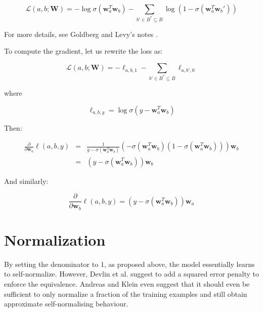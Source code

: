 \documentclass[a4paper,oneside,12pt]{article}
\begin{document}
\begin{equation}
\mathcal{L} (a, b ; \mathbf{W}) = -\log \sigma \left( \mathbf{w}_a^T \mathbf{w}_b \right) - \sum_{b' \in B^* \subseteq B} \log \left( 1 - \sigma \left( \mathbf{w}_a^T \mathbf{w}_b' \right) \right)
\end{equation}


For more details, see Goldberg and Levy's notes \cite{Goldberg2014word2vecED}.

To compute the gradient, let us rewrite the loss as:

\begin{equation}
\mathcal{L} (a, b ; \mathbf{W}) = -\ell_{a, b, 1} - \sum_{b' \in B^* \subseteq B} \ell_{a, b', 0}
\end{equation}

where

\begin{equation}
\ell_{a, b, y} = \log \sigma \left( y - \mathbf{w}_a^T \mathbf{w}_b \right)
\end{equation}

Then:

\begin{equation}
\begin{array}{lll}
\frac{\partial}{\partial \mathbf{w}_a} \ell (a, b, y) & = & \frac{1}{y - \sigma \left(\mathbf{w}_a^T \mathbf{w}_b \right)}
\left( - \sigma \left(\mathbf{w}_a^T \mathbf{w}_b \right) \left( 1 - \sigma \left(\mathbf{w}_a^T \mathbf{w}_b \right) \right) \right) \mathbf{w}_b \\
& = & \left( y - \sigma \left(\mathbf{w}_a^T \mathbf{w}_b \right) \right) \mathbf{w}_b
\end{array}
\end{equation}

And similarly:

\begin{equation}
\frac{\partial}{\partial \mathbf{w}_b} \ell (a, b, y) = \left( y - \sigma \left(\mathbf{w}_a^T \mathbf{w}_b \right) \right) \mathbf{w}_a
\end{equation}


\section{Normalization}

By setting the denominator to $1$, as proposed above, the model essentially learns to self-normalize.
However, Devlin et al. \cite{devlin-etal-2014-fast} suggest to add a squared error penalty to enforce the equivalence.
Andreas and Klein \cite{andreas-norm} even suggest that it should even be sufficient to only normalize a fraction of the training examples and still obtain approximate self-normalising behaviour.
\end{document}
